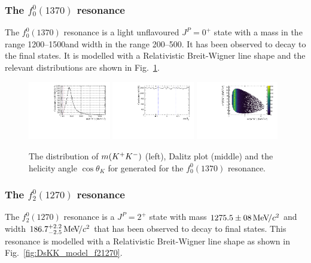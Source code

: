 \subsubsection{The $f_{0}^{0}(1370)$ resonance}
The $f_{0}^{0}(1370)$ resonance is a light unflavoured $J^{P} = 0^{+}$ state with a mass in the range 1200--1500\mevcc and width in the range 200--500\mevcc. It has been observed to decay to the \kaon\Kb final states. It is modelled with a Relativistic Breit-Wigner line shape and the relevant distributions are shown in Fig.~\ref{fig:DsKK_model_f01370}.
\begin{figure}[!h]
   \centering   
   \includegraphics[width=0.32\textwidth]{figs/B2DsPhi/f0_1370_phi_mass.pdf}
   \includegraphics[width=0.32\textwidth]{figs/B2DsPhi/f0_1370_Helicity.pdf}
   \includegraphics[width=0.32\textwidth]{figs/B2DsPhi/f0_1370_Dalitz_plot.pdf}
   \caption{The distribution of $m({{K}^+}{{K}^-})$ (left), Dalitz plot (middle) and the helicity angle $\cos\theta_{K}$ for generated for the $f_{0}^{0}(1370)$ resonance.} 
   \label{fig:DsKK_model_f01370}   
\end{figure}

\subsubsection{The $f_{2}^{0}(1270)$ resonance}
The $f_{2}^{0}(1270)$ resonance is a $J^{P} = 2^{+}$ state with mass $1275.5\pm08{\mathrm{\,Me\kern -0.1em V\!/}c^2}$ and width $186.7^{+2.2}_{-2.5}{\mathrm{\,Me\kern -0.1em V\!/}c^2}$ that has been observed to decay to \kaon\Kb final states. This resonance is modelled with a Relativistic Breit-Wigner line shape as shown in Fig.~\ref{fig:DsKK_model_f21270}.

